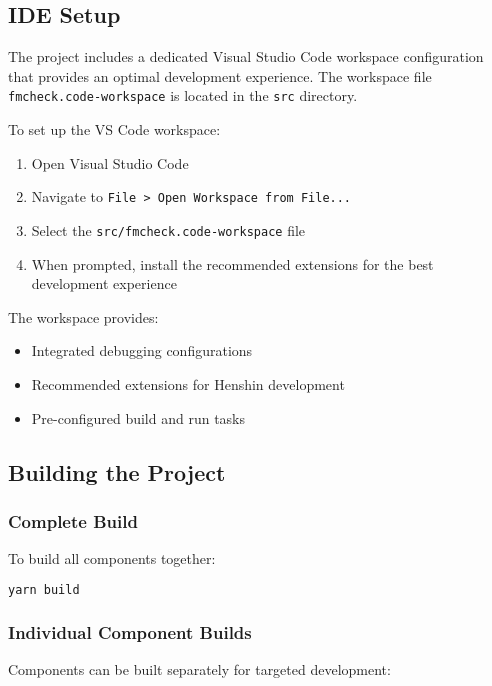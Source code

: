 \subsection{IDE Setup}
\label{subsec:ide_setup}

The project includes a dedicated Visual Studio Code workspace configuration that provides an optimal development experience. The workspace file \texttt{fmcheck.code-workspace} is located in the \texttt{src} directory.

To set up the VS Code workspace:

\begin{enumerate}
    \item Open Visual Studio Code
    \item Navigate to \texttt{File > Open Workspace from File...}
    \item Select the \texttt{src/fmcheck.code-workspace} file
    \item When prompted, install the recommended extensions for the best development experience
\end{enumerate}

The workspace provides:
\begin{itemize}
    \item Integrated debugging configurations
    \item Recommended extensions for Henshin development
    \item Pre-configured build and run tasks
\end{itemize}

\subsection{Building the Project}
\label{subsec:building}

\subsubsection{Complete Build}

To build all components together:

\begin{lstlisting}[language=bash]
yarn build
\end{lstlisting}

\subsubsection{Individual Component Builds}

Components can be built separately for targeted development:

